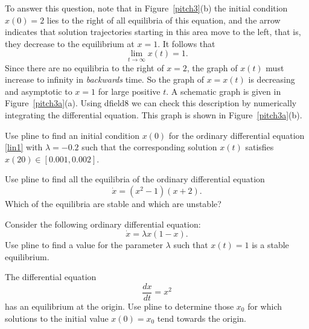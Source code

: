 \documentclass{ximera}
\begin{document}
To answer this question, note that in Figure~\ref{pitch3}(b) the
initial condition $x(0)=2$ lies to the right of all equilibria of
this equation, and the arrow indicates that solution trajectories
starting in this area move to the left, that is, they decrease to
the equilibrium at $x=1$.  It follows that
\[
\lim_{t\to\infty} x(t) = 1.
\]
Since there are no equilibria to the right of $x=2$, the graph of $x(t)$
must increase to infinity in {\em backwards\/} time.  So the graph of 
$x=x(t)$ is decreasing and asymptotic to $x=1$ for large positive $t$.  
A schematic graph is given in Figure~\ref{pitch3a}(a).  Using {\sf dfield8} 
we can check this description by numerically integrating the differential
equation.   This graph is shown in Figure~\ref{pitch3a}(b).

\begin{figure*}[htb]
       \centerline{%
	}
       \caption{Time series for solution to $\dot{x}=x(1-x^2)$ with $x(0)=2$.
	(Left) Sketch using asymptotic information; (right) {\sf dfield8}
	computation.}
       \label{pitch3a}
\end{figure*}



\EXER

\CEXER

\begin{exercise} \label{c3.3.1}
Use {\sf pline} to find an initial condition $x(0)$ for the
ordinary differential equation \eqref{lin1} with $\lambda=-0.2$
such that the corresponding solution $x(t)$ satisfies
$x(20)\in[0.001,0.002]$.
\end{exercise}

\begin{exercise} \label{c3.3.2}
Use {\sf pline} to find all the equilibria of the ordinary
differential equation
\[
\dot{x} = (x^2-1)(x+2).
\]
Which of the equilibria are stable and which are unstable?
\end{exercise}

\begin{exercise} \label{c3.3.3}
Consider the following ordinary differential equation:
\[
\dot{x} = \lambda x(1-x).
\]
Use {\sf pline} to find a value for the parameter $\lambda$ such
that $x(t)=1$ is a stable equilibrium.
\end{exercise}

\begin{exercise} \label{c3.3.4}
The differential equation
\[
\frac{dx}{dt} =  x^2
\]
has an equilibrium at the origin.  Use {\sf pline} to determine
those $x_0$ for which solutions to the initial value $x(0)=x_0$ tend
towards the origin.
\end{exercise}
\end{document}

